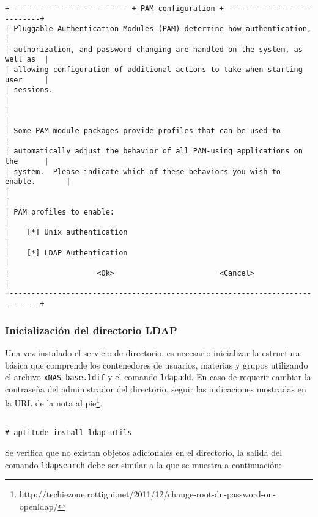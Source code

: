 {
\scriptsize
\linespread{1}
\begin{verbatim}
+----------------------------+ PAM configuration +----------------------------+
| Pluggable Authentication Modules (PAM) determine how authentication,        |
| authorization, and password changing are handled on the system, as well as  |
| allowing configuration of additional actions to take when starting user     |
| sessions.                                                                   |
|                                                                             |
| Some PAM module packages provide profiles that can be used to               |
| automatically adjust the behavior of all PAM-using applications on the      |
| system.  Please indicate which of these behaviors you wish to enable.       |
|                                                                             |
| PAM profiles to enable:                                                     |
|    [*] Unix authentication                                                  |
|    [*] LDAP Authentication                                                  |
|                    <Ok>                        <Cancel>                     |
+-----------------------------------------------------------------------------+
\end{verbatim}
}

          \subsubsection {Inicializaci\'{o}n del directorio \textsc{LDAP}}

Una vez instalado el servicio de directorio, es necesario inicializar la estructura b\'{a}sica que comprende los contenedores de usuarios, materias y grupos utilizando el archivo \texttt{xNAS-base.ldif} y el comando \texttt{ldapadd}. En caso de requerir cambiar la contrase\~{n}a del administrador del directorio, seguir las indicaciones mostradas en la URL de la nota al pie\footnote{http://techiezone.rottigni.net/2011/12/change-root-dn-password-on-openldap/}.


{
\scriptsize
\linespread{1}
\begin{verbatim}

# aptitude install ldap-utils
 \end{verbatim}
}

Se verifica que no existan objetos adicionales en el directorio, la salida del comando \texttt{ldapsearch} debe ser similar a la que se muestra a continuaci\'{o}n:

